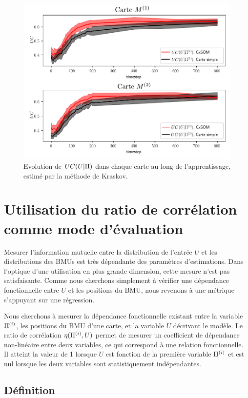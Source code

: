 \documentclass[../main]{subfiles}
\begin{document}
\begin{figure}
\includegraphics[width=\textwidth]{evolution_MI_K}
\caption{Evolution de $UC(U|\Pi)$ dans chaque carte au long de l'apprentissage, estimé par la méthode de Kraskov.\label{fig:MI_evol_total}}

\end{figure}

\section{Utilisation du ratio de corrélation comme mode d'évaluation}


Mesurer l'information mutuelle entre la distribution de l'entrée $U$ et les distributions des BMUs est très dépendante des paramètres d'estimations. Dans l'optique d'une utilisation en plus grande dimension, cette mesure n'est pas satisfaisante. Comme nous cherchons simplement à vérifier une dépendance fonctionnelle entre $U$ et les positions du BMU, nous revenons à une métrique s'appuyant sur une régression.

Nous cherchons à mesurer la dépendance fonctionnelle existant entre la variable $\Pi^{({i})}$, les positions du BMU d'une carte, et la variable $U$ décrivant le modèle.
Le ratio de corrélation $\eta(\Pi^{({i})},U)$ permet de mesurer un coefficient de dépendance non-linéaire entre deux variables, ce qui correspond à une relation fonctionnelle. Il atteint la valeur de 1 lorsque $U$ est fonction de la première variable $\Pi^{({i})}$ et est nul lorsque les deux variables sont statistiquement indépendantes.


\subsection{Définition}
\end{document}
